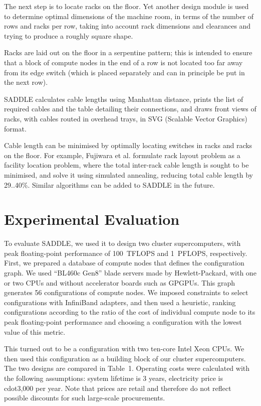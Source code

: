 \documentclass[runningheads,a4paper]{llncs}
\begin{document}
The next step is to locate racks on the floor. Yet another design module is used to determine optimal dimensions of the machine room, in terms of the number of rows and racks per row, taking into account rack dimensions and clearances and trying to produce a roughly square shape.

Racks are laid out on the floor in a serpentine pattern; this is intended to ensure that a block of compute nodes in the end of a row is not located too far away from its edge switch (which is placed separately and can in principle be put in the next row).

SADDLE calculates cable lengths using Manhattan distance, prints the list of required cables and the table detailing their connections, and draws front views of racks, with cables routed in overhead trays, in SVG (Scalable Vector Graphics) format.

Cable length can be minimised by optimally locating switches in racks and racks on the floor. For example, Fujiwara et al. \cite{fujiwara2012cabinet} formulate rack layout problem as a facility location problem, where the total inter-rack cable length is sought to be minimised, and solve it using simulated annealing, reducing total cable length by 29..40\%. Similar algorithms can be added to SADDLE in the future.


\section{Experimental Evaluation}
\label{section:Experimental-Evaluation}

To evaluate SADDLE, we used it to design two cluster supercomputers, with peak floating-point performance of 100~TFLOPS and 1~PFLOPS, respectively. First, we prepared a database of compute nodes that defines the configuration graph. We used ``BL460c Gen8'' blade servers made by Hewlett-Packard, with one or two CPUs and without accelerator boards such as GPGPUs. This graph generates 56 configurations of compute nodes. We imposed constraints to select configurations with InfiniBand adapters, and then used a heuristic, ranking configurations according to the ratio of the cost of individual compute node to its peak floating-point performance and choosing a configuration with the lowest value of this metric.

This turned out to be a configuration with two ten-core Intel Xeon CPUs. We then used this configuration as a building block of our cluster supercomputers. The two designs are compared in Table~1. Operating costs were calculated with the following assumptions: system lifetime is 3 years, electricity price is \\cdot3,000 per year. Note that prices are retail and therefore do not reflect possible discounts for such large-scale procurements.
\end{document}
